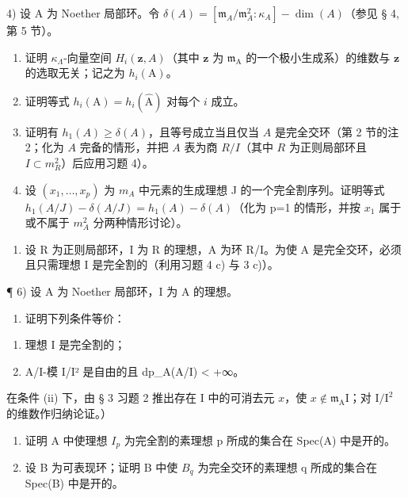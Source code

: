 4) 设 A 为 Noether 局部环。令 \(\delta(A) = [\mathfrak{m}_{A}/\mathfrak{m}_{A}^{2}:\kappa_{A}] - \dim(A)\)（参见 § 4, 第 5 节）。

\begin{enumerate}
\def\labelenumi{\alph{enumi})}
\item
  证明 \(\kappa_{\Lambda}\)-向量空间 \(H_{i}(\mathbf{z}, A)\)（其中 \(\mathbf{z}\) 为 \(\mathfrak{m}_{\mathrm{A}}\) 的一个极小生成系）的维数与 \(\mathbf{z}\) 的选取无关；记之为 \(h_{i}(\mathrm{A})\)。
\item
  证明等式 \(h_i(\mathrm{A}) = h_i(\widehat{\mathrm{A}})\) 对每个 \(i\) 成立。
\item
  证明有 \(h_1(A) \geqslant \delta(A)\)，且等号成立当且仅当 \(A\) 是完全交环（第 2 节的注 2；化为 \(A\) 完备的情形，并把 \(A\) 表为商 \(R/I\)（其中 \(R\) 为正则局部环且 \(I \subset m_R^2\)）后应用习题 4）。
\item
  设 \((x_{1},\ldots,x_{p})\) 为 \(m_{A}\) 中元素的生成理想 J 的一个完全割序列。证明等式 \(h_{1}(A/J)-\delta(A/J)=h_{1}(A)-\delta(A)\)（化为 p=1 的情形，并按 \(x_{1}\) 属于或不属于 \(m_{A}^{2}\) 分两种情形讨论）。
\end{enumerate}

\begin{enumerate}
\def\labelenumi{\arabic{enumi})}
\setcounter{enumi}{4}
\tightlist
\item
  设 R 为正则局部环，I 为 R 的理想，A 为环 R/I。为使 A 是完全交环，必须且只需理想 I 是完全割的（利用习题 4 c) 与 3 c)）。
\end{enumerate}

¶ 6) 设 A 为 Noether 局部环，I 为 A 的理想。

\begin{enumerate}
\def\labelenumi{\alph{enumi})}
\tightlist
\item
  证明下列条件等价：
\end{enumerate}

\begin{enumerate}
\def\labelenumi{(\roman{enumi})}
\item
  理想 I 是完全割的；
\item
  A/I-模 I/I² 是自由的且 dp\_A(A/I) \textless{} +∞。
\end{enumerate}

在条件 (ii) 下，由 § 3 习题 2 推出存在 I 中的可消去元 \(x\)，使 \(x \notin \mathfrak{m}_{\mathrm{A}}\mathrm{I}\)；对 \(\mathrm{I} / \mathrm{I}^2\) 的维数作归纳论证。）

\begin{enumerate}
\def\labelenumi{\alph{enumi})}
\setcounter{enumi}{1}
\item
  证明 A 中使理想 \(I_{p}\) 为完全割的素理想 p 所成的集合在 Spec(A) 中是开的。
\item
  设 B 为可表现环；证明 B 中使 \(B_{q}\) 为完全交环的素理想 q 所成的集合在 Spec(B) 中是开的。
\end{enumerate}

